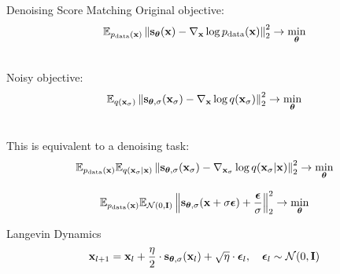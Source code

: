\documentclass{beamer}
\renewcommand{\eqpause}{}
\begin{document}
\begin{frame}{Denoising Score Matching}
	Original objective:
	\vspace{-0.2cm}
	\[
		\mathbb{E}_{p_{\text{data}}(\mathbf{x})}\left\| \mathbf{s}_{\boldsymbol{\theta}}(\mathbf{x}) - \nabla_{\mathbf{x}} \log p_{\text{data}}(\mathbf{x}) \right\|_2^2 \rightarrow \min_{\boldsymbol{\theta}}
	\]
    \eqpause
	\vspace{-0.5cm} \\
	Noisy objective:
	\vspace{-0.2cm}
	\[
		\mathbb{E}_{q(\mathbf{x}_{\sigma})}\left\| \mathbf{s}_{\boldsymbol{\theta}, \sigma}(\mathbf{x}_\sigma) - \nabla_{\mathbf{x}} \log q(\mathbf{x}_{\sigma}) \right\|_2^2 \rightarrow \min_{\boldsymbol{\theta}}
	\]
    \eqpause
	\vspace{-0.5cm} \\
	This is equivalent to a denoising task:
	\vspace{-0.2cm}
	\[
		\mathbb{E}_{p_{\text{data}}(\mathbf{x})} \mathbb{E}_{q(\mathbf{x}_{\sigma} | \mathbf{x})}\left\| \mathbf{s}_{\boldsymbol{\theta}, \sigma}(\mathbf{x}_{\sigma}) - \nabla_{\mathbf{x}_{\sigma}} \log q(\mathbf{x}_{\sigma} | \mathbf{x}) \right\|_2^2 \rightarrow \min_{\boldsymbol{\theta}}
	\]
    \eqpause
	\vspace{-0.3cm}
	\[
		\mathbb{E}_{p_{\text{data}}(\mathbf{x})} \mathbb{E}_{\mathcal{N}(0, \mathbf{I})}\left\| \mathbf{s}_{\boldsymbol{\theta}, \sigma}(\mathbf{x} + \sigma \boldsymbol{\epsilon}) + \frac{\boldsymbol{\epsilon}}{\sigma} \right\|_2^2 \rightarrow \min_{\boldsymbol{\theta}}
	\]
    \eqpause
	\vspace{-0.5cm}
	\begin{block}{Langevin Dynamics}
		\vspace{-0.3cm}
		\[
			\mathbf{x}_{l + 1} = \mathbf{x}_l + \frac{\eta}{2} \cdot \mathbf{s}_{\boldsymbol{\theta}, \sigma}(\mathbf{x}_l) + \sqrt{\eta} \cdot \boldsymbol{\epsilon}_l, \quad \boldsymbol{\epsilon}_l \sim \mathcal{N}(0, \mathbf{I})
		\]
		\vspace{-0.7cm}
	\end{block}
\end{frame}
\end{document}
